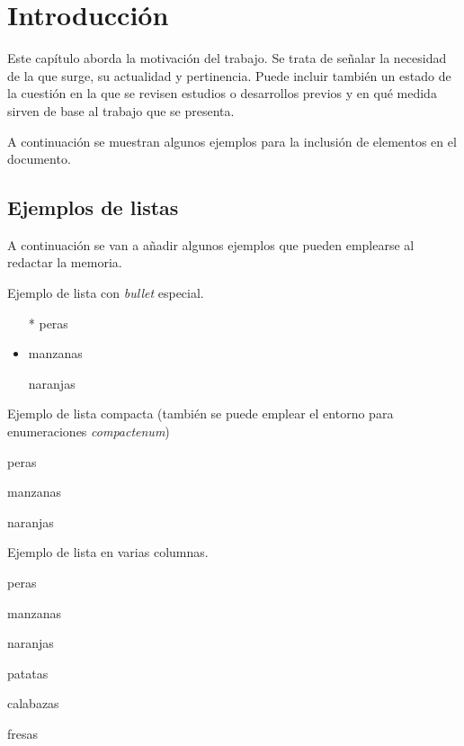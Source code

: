 \chapter{Introducción}
\label{cap:Introduccion}

Este capítulo aborda la motivación del trabajo. Se trata de señalar la necesidad de la que surge, su actualidad y pertinencia. Puede incluir también un estado de la cuestión en la que se revisen estudios o desarrollos previos y en qué medida sirven de base al trabajo que se presenta.

A continuación se muestran algunos ejemplos para la inclusión de elementos en el documento.

\section{Ejemplos de listas}
\label{sec:ejListas}
A continuación se van a añadir algunos ejemplos que pueden emplearse al redactar la memoria.

\noindent Ejemplo de lista con \emph{bullet} especial. 
\begin{itemize}
	\item[*] peras
	\item manzanas
	\item[\ding{170}] naranjas
\end{itemize}

\noindent Ejemplo de lista compacta (también se puede emplear el entorno para enumeraciones \emph{compactenum})
\begin{compactitem}
	\item peras
	\item manzanas
	\item naranjas
\end{compactitem}


\noindent Ejemplo de lista en varias columnas.
\begin{multicols}{2} %
	\begin{compactenum}
		\item peras
		\item manzanas
		\item naranjas
		\item patatas
		\item calabazas
		\item fresas
	\end{compactenum}
\end{multicols}


